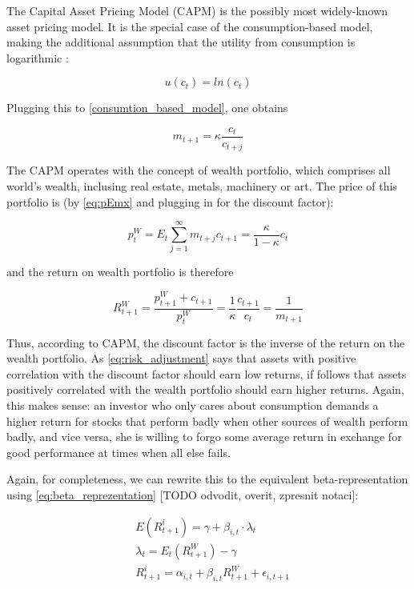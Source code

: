 	 		The Capital Asset Pricing Model (CAPM) is the possibly most widely-known asset pricing model. It is the special case of the consumption-based model, making the additional assumption that the utility from consumption is logarithmic \citep{rubinstein1976valuation}:
	 		
	 		\begin{equation}
	 			u(c_t) = ln(c_t)
	 		\end{equation}
	 		
	 		Plugging this to \ref{consumtion_based_model}, one obtains 
	 		
	 		\begin{equation}
	 			m_{t+1} = \kappa \frac{c_t}{c_{t+j}}
	 		\end{equation}
	 		
	 		The CAPM operates with the concept of wealth portfolio, which comprises all world's wealth, inclusing real estate, metals, machinery or art. The price of this portfolio is (by \ref{eq:pEmx} and plugging in for the discount factor):  
	 		
	 		\begin{equation}
	 		p_t^W  = E_t \sum_{j=1}^{\infty} m_{t+j}c_{t+1} = \frac{\kappa}{1-\kappa}c_t
	 		\end{equation}
	 		
	 		and the return on wealth portfolio is therefore 
	 		
	 		\begin{equation}
	 		R_{t+1}^W  = \frac{p_{t+1}^W + c_{t+1}}{p_t^W} = \frac{1}{\kappa} \frac{c_{t+1}}{c_t} = \frac{1}{m_{t+1}}
	 		\end{equation}
	 		
	 		Thus, according to CAPM, the discount factor is the inverse of the return on the wealth portfolio. As \ref{eq:risk_adjustment} says that assets with positive correlation with the discount factor should earn low returns, if follows that assets positively correlated with the wealth portfolio should earn higher returns. Again, this makes sense: an investor who only cares about consumption demands a higher return for stocks that perform badly when other sources of wealth perform badly, and vice versa, she is willing to forgo some average return in exchange for good performance at times when all else fails. 
	 		
	 		Again, for completeness, we can rewrite this to the equivalent beta-representation using \ref{eq:beta_reprezentation} [TODO odvodit, overit, zpresnit notaci]: 
	 		
	 		\begin{align}
	 			& E(R_{t+1}^i) = \gamma + \beta_{i,t} \cdot \lambda_{t} \\
	 			& \lambda_{t} = E_t(R^W_{t+1}) - \gamma \\
	 			& R_{t+1}^i = \alpha_{i,t} + \beta_{i,t} R^W_{t+1} + \epsilon_{i,t+1}
	 		\end{align}  
	 		
